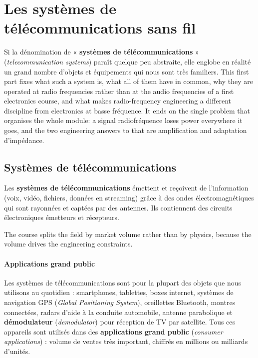 \section{Les systèmes de télécommunications sans fil}
Si la dénomination de « \textbf{systèmes de télécommunications} »
(\textit{telecommunication systems}) paraît quelque peu abstraite, elle englobe
en réalité un grand nombre d'objets et équipements qui nous sont très familiers.
This first part fixes what such a system is, what all of them have in common,
why they are operated at radio frequencies rather than at the audio frequencies
of a first electronics course, and what makes radio-frequency engineering a
different discipline from electronics at basse fréquence. It ends on the single
problem that organises the whole module: a signal radiofréquence loses power
everywhere it goes, and the two engineering answers to that are amplification
and adaptation d'impédance.

\subsection{Systèmes de télécommunications}

\begin{definition}
  Les \textbf{systèmes de télécommunications} émettent et reçoivent de
  l'information (voix, vidéo, fichiers, données en streaming) grâce à des
  ondes électromagnétiques qui sont rayonnées et captées par des antennes. Ils
  contiennent des circuits électroniques émetteurs et récepteurs.
\end{definition}

The course splits the field by market volume rather than by physics, because the
volume drives the engineering constraints.

\paragraph{Applications grand public} Les systèmes de télécommunications sont
pour la plupart des objets que nous utilisons au quotidien : smartphones,
tablettes, boxes internet, systèmes de navigation GPS (\textit{Global
Positioning System}), oreillettes Bluetooth, montres connectées, radars d'aide à
la conduite automobile, antenne parabolique et \textbf{démodulateur}
(\textit{demodulator}) pour réception de TV par satellite. Tous ces appareils
sont utilisés dans des \textbf{applications grand public} (\textit{consumer
applications}) : volume de ventes très important, chiffrés en millions ou
milliards d'unités.

